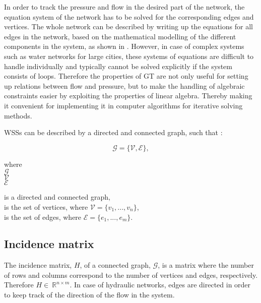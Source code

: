 In order to track the pressure and flow in the desired part of the network, the equation system of the network has to be solved for the corresponding edges and vertices. The whole network can be described by writing up the equations for all edges in the network, based on the mathematical modelling of the different components in the system, as shown in . However, in case of complex systems such as water networks for large cities, these systems of equations are difficult to handle individually and typically cannot be solved explicitly if the system consists of loops. Therefore the properties of GT are not only useful for setting up relations between flow and pressure, but to make the handling of algebraic constraints easier by exploiting the properties of linear algebra. Thereby making it convenient for implementing it in computer algorithms for iterative solving methods.  

WSSs can be described by a directed and connected graph, such that \cite{graph_intro}: 

\begin{equation}
  \label{Numberofchords}
  \mathcal{G} = \{\mathcal{V}, \mathcal{E} \} ,
\end{equation}

\begin{minipage}[t]{0.2\textwidth}
where\\
\hspace*{8mm} $\mathcal{G} $ \\
\hspace*{8mm} $\mathcal{V} $ \\
\hspace*{8mm} $\mathcal{E} $
\end{minipage}
\begin{minipage}[t]{0.68\textwidth}
\vspace*{2mm}
is a directed and connected graph,\\
is the set of vertices, where $\mathcal{V} = \{v_1, ..., v_n\}$,\\
is the set of edges, where $\mathcal{E} = \{e_1, ..., e_m\}$. 
\end{minipage}

\subsection{Incidence matrix}
\label{incidence_matrix}

The incidence matrix, $H$, of a connected graph, $\mathcal{G}$, is a matrix where the number of rows and columns correspond to the number of vertices and edges, respectively. Therefore $H\in \: \mathbb{R}^{n \times m}$. In case of hydraulic networks, edges are directed in order to keep track of the direction of the flow in the system. 

